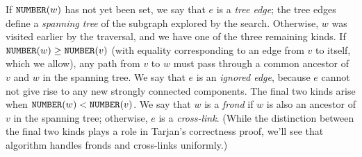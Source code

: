 \documentclass[../generics]{subfiles}
\begin{document}
If $\texttt{NUMBER}(w)$ has not yet been set, we say that $e$ is a \emph{tree edge}; the tree edges define a \emph{spanning tree} of the subgraph explored by the search. Otherwise, $w$ was visited earlier by the traversal, and we have one of the three remaining kinds. If $\texttt{NUMBER}(w)\geq\texttt{NUMBER}(v)$ (with equality corresponding to an edge from $v$ to itself, which we allow), any path from $v$ to $w$ must pass through a common ancestor of $v$ and $w$ in the spanning tree. We say that $e$ is an \emph{ignored edge}, because $e$ cannot not give rise to any new strongly connected components. The final two kinds arise when $\texttt{NUMBER}(w)<\texttt{NUMBER}(v)$. We say that $w$ is a \emph{frond} if $w$ is also an ancestor of $v$ in the spanning tree; otherwise, $e$ is a \emph{cross-link}. (While the distinction between the final two kinds plays a role in Tarjan's correctness proof, we'll see that algorithm handles fronds and cross-links uniformly.)

\begin{wrapfigure}[11]{l}{2.9cm}
\end{wrapfigure}
\end{document}
